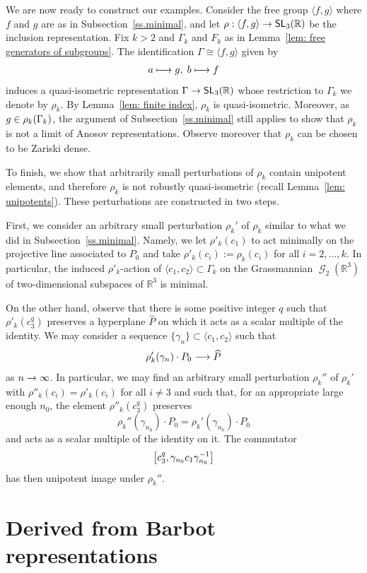 \documentclass[AHL,Unicode,longabstracts]{cedram}
\DeclareMathOperator{\SL}{\mathsf{SL}}
\DeclareMathOperator{\Gr}{\mathcal{G}}
\newcommand{\R}{\mathbb{R}}
\renewcommand*{\to}{\mathchoice{\longrightarrow}{\rightarrow}{\rightarrow}{\rightarrow}}
\let\originalleft\left
\let\originalright\right
\renewcommand{\left}{\mathopen{}\mathclose\bgroup\originalleft}
\renewcommand{\right}{\aftergroup\egroup\originalright}
\let\oldmapsto\mapsto
\renewcommand*{\mapsto}{\mathchoice{\longmapsto}{\oldmapsto}{\oldmapsto}{\oldmapsto}}
\let\oldin\in
\renewcommand{\in}{\mathchoice{\oldin}{\oldin}{\,\oldin\,}{\,\oldin\,}}
\begin{document}
We are now ready to construct our examples. Consider the free group $\langle f,g\rangle $ where $f$ and $g$ are as in Subsection~\ref{ss.minimal}, and let $\rho:\langle f,g\rangle\to\SL_3(\R)$ be the inclusion representation. Fix $k>2$ and $\Gamma_k$ and $F_k$ as in Lemma~\ref{lem: free generators of subgroups}.
The identification $\Gamma\cong\langle f,g\rangle$ given by
\[
a\mapsto g, \;b\mapsto f
\]
induces a quasi-isometric representation $\Gamma\to\SL_3(\R)$ whose restriction to $\Gamma_k$ we denote by $\rho_k$. By Lemma~\ref{lem: finite index}, $\rho_k$ is quasi-isometric. Moreover, as $g\in \rho_k(\Gamma_k)$, the argument of Subsection~\ref{ss.minimal} still applies to show that $\rho_k$ is not a limit of Anosov representations. Observe moreover that $\rho_k$ can be chosen to be Zariski dense.


To finish, we show that arbitrarily small perturbations of $\rho_k$ contain unipotent elements, and therefore $\rho_k$ is not robustly quasi-isometric (recall Lemma~\ref{lem: unipotents}). These perturbations are constructed in two steps.

First, we consider an arbitrary small perturbation $\rho_k'$ of $\rho_k$ similar to what we did in Subsection~\ref{ss.minimal}. Namely, we let $\rho'_k(c_1)$ to act minimally on the projective line associated to $P_0$ and take $\rho'_k(c_i):=\rho_k(c_i)$ for all $i=2,\dots,k$. In particular, the induced $\rho'_k$-action of $\langle c_1,c_2\rangle\subset\Gamma_k$ on the Grassmannian $\Gr_2(\R^3)$ of two-dimensional subspaces of $\R^3$ is minimal.

On the other hand, observe that there is some positive integer $q$ such that $\rho'_k(c_3^q)$ preserves a hyperplane $\widehat{P}$ on which it acts as a scalar multiple of the identity.
We may consider a sequence $\{\gamma_n\}\subset \langle c_1,c_2\rangle$ such that
\[
\rho_k'(\gamma_n)\cdot P_0\to\widehat{P}
\]
as $n\to\infty$.
In particular, we may find an arbitrary small perturbation $\rho_k''$ of $\rho_k'$ with $\rho''_k(c_i)=\rho'_k(c_i)$ for all $i\neq 3$ and such that, for an appropriate large enough $n_0$, the element $\rho''_k(c_3^q)$ preserves
\[
\rho_k''(\gamma_{n_0})\cdot P_0=\rho_k'(\gamma_{n_0})\cdot P_0
\]
and acts as a scalar multiple of the identity on it.
The commutator
\[
\left[c_3^q,\gamma_{n_0}c_1\gamma_{n_0}^{-1}\right]
\]
has then unipotent image under $\rho_k''$.



\section{Derived from Barbot representations}\label{sec. derived from barbot}
\end{document}
